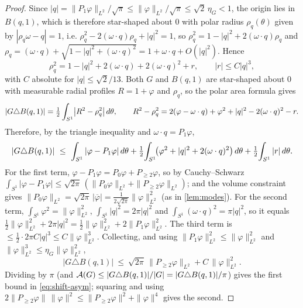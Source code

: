 \begin{proof}
Since $|q|=\|P_1\varphi\|_{L^2}/\sqrt\pi\le\|\varphi\|_{L^2}/\sqrt\pi\le
\sqrt2\,\eta_G<1$, the origin lies in $B(q,1)$, which is therefore star-shaped
about $0$ with polar radius $\rho_q(\theta)$ given by $|\rho_q\omega-q|=1$, i.e.
$\rho_q^2-2(\omega\cdot q)\rho_q+|q|^2=1$, so $\rho_q^2=1-|q|^2+2(\omega\cdot q)
\rho_q$ and $\rho_q=(\omega\cdot q)+\sqrt{1-|q|^2+(\omega\cdot q)^2}
=1+\omega\cdot q+O(|q|^2)$. Hence
\[
   \rho_q^2=1-|q|^2+2(\omega\cdot q)+2(\omega\cdot q)^2+r,\qquad
   |r|\le C|q|^3 ,
\]
with $C$ absolute for $|q|\le\sqrt2/13$. Both $G$ and $B(q,1)$ are star-shaped
about $0$ with measurable radial profiles $R=1+\varphi$ and $\rho_q$, so the
polar area formula gives
\[
   |G\triangle B(q,1)|=\tfrac12\int_{S^1}\bigl|R^2-\rho_q^2\bigr|\,d\theta,
   \qquad
   R^2-\rho_q^2=2(\varphi-\omega\cdot q)+\varphi^2+|q|^2-2(\omega\cdot q)^2-r .
\]
Therefore, by the triangle inequality and $\omega\cdot q=P_1\varphi$,
\[
   |G\triangle B(q,1)|
   \ \le\ \int_{S^1}|\varphi-P_1\varphi|\,d\theta
   +\tfrac12\!\int_{S^1}\!\bigl(\varphi^2+|q|^2+2(\omega\cdot q)^2\bigr)\,d\theta
   +\tfrac12\!\int_{S^1}|r|\,d\theta .
\]
For the first term, $\varphi-P_1\varphi=P_0\varphi+P_{\ge2}\varphi$, so by
Cauchy--Schwarz $\int_{S^1}|\varphi-P_1\varphi|\le\sqrt{2\pi}\,
(\|P_0\varphi\|_{L^2}+\|P_{\ge2}\varphi\|_{L^2})$; and the volume constraint
gives $\|P_0\varphi\|_{L^2}=\sqrt{2\pi}\,|\overline\varphi|=\tfrac1{2\sqrt{2\pi}}
\|\varphi\|_{L^2}^2$ (as in \cref{lem:modes}). For the second term,
$\int_{S^1}\varphi^2=\|\varphi\|_{L^2}^2$, $\int_{S^1}|q|^2=2\pi|q|^2$ and
$\int_{S^1}(\omega\cdot q)^2=\pi|q|^2$, so it equals $\tfrac12\|\varphi\|_{L^2}^2
+2\pi|q|^2=\tfrac12\|\varphi\|_{L^2}^2+2\|P_1\varphi\|_{L^2}^2$. The third term
is $\le\tfrac12\cdot2\pi C|q|^3\le C\|\varphi\|_{L^2}^3$. Collecting, and using
$\|P_1\varphi\|_{L^2}^2\le\|\varphi\|_{L^2}^2$ and $\|\varphi\|_{L^2}^3\le
\eta_G\|\varphi\|_{L^2}^2$,
\[
   |G\triangle B(q,1)|\ \le\ \sqrt{2\pi}\,\|P_{\ge2}\varphi\|_{L^2}
   +C\,\|\varphi\|_{L^2}^2 .
\]
Dividing by $\pi$ (and $\mathcal{A}(G)\le|G\triangle B(q,1)|/|G|=|G\triangle
B(q,1)|/\pi$) gives the first bound in \eqref{eq:shift-asym}; squaring and using
$2\|P_{\ge2}\varphi\|\,\|\varphi\|^2\le\|P_{\ge2}\varphi\|^2+\|\varphi\|^4$
gives the second.
\end{proof}

